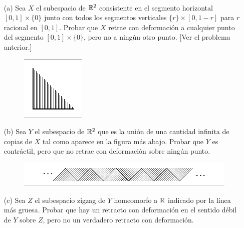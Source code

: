 \documentclass[twoside]{article}
\begin{document}
\begin{ejercicio}{0.6}\
\begin{enumerate}

\item[(a)] Sea $X$ el subespacio de $\mathbb{R}^2$ consistente en el segmento horizontal $[0,1]\times\{0\}$ junto con todos los segmentos verticales $\{r\}\times[0,1-r]$ para $r$ racional en $[0,1]$. Probar que $X$ retrae con deformación a cualquier punto del segmento $[0,1]\times\{0\}$, pero no a ningún otro punto. [Ver el problema anterior.]

\begin{figure}[h!]
\centering
\includegraphics[scale=0.7]{peine}
\end{figure}

\item[(b)] Sea $Y$ el subespacio de $\mathbb{R}^2$ que es la unión de una cantidad infinita de copias de $X$ tal como aparece en la figura más abajo. Probar que $Y$ es contráctil, pero que no retrae con deformación sobre ningún punto.
\begin{figure}[h!]
\centering
\includegraphics[scale=0.7]{peines}
\end{figure}

\item[(c)] Sea $Z$ el subespacio zigzag de $Y$ homeomorfo a $\mathbb{R}$ indicado por la línea más gruesa. Probar que hay un retracto con deformación en el sentido débil de $Y$ sobre $Z$, pero no un verdadero retracto con deformación. 
\end{enumerate}
\end{ejercicio}
\end{document}
